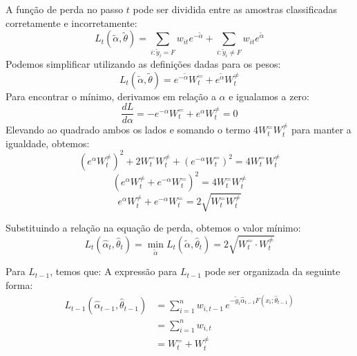 A função de perda no passo $t$ pode ser dividida entre as amostras classificadas corretamente e incorretamente:
\begin{equation*}
    L_t(\tilde{\alpha}, \tilde{\theta}) = \sum_{i: \tilde{y}_i = F} w_{it} e^{-\tilde{\alpha}} + \sum_{i: \tilde{y}_i \neq F} w_{it} e^{\tilde{\alpha}}
\end{equation*}
Podemos simplificar utilizando as definições dadas para os pesos:
\begin{equation*}
    L_t(\tilde{\alpha}, \tilde{\theta}) = e^{-\tilde{\alpha}}W_t^{=} + e^{\tilde{\alpha}}W_t^{\neq}
\end{equation*}
Para encontrar o mínimo, derivamos em relação a $\alpha$ e igualamos a zero:
\begin{equation*}
    \frac{dL}{d\alpha} = -e^{-\alpha} W_t^{=} + e^{\alpha} W_t^{\neq} = 0
\end{equation*}
Elevando ao quadrado ambos os lados e somando o termo 4$W_t^{=}W_t^{\neq}$ para manter a igualdade, obtemos:
\begin{equation*}
    (e^{\alpha} W_t^{\neq})^2 + 2W_t^{=}W_t^{\neq} + (e^{-\alpha}W_t^{=})^2 = 4W_t^{=}W_t^{\neq}
\end{equation*}
\begin{equation*}
    (e^{\alpha} W_t^{\neq} + e^{-\alpha} W_t^{=})^2 = 4W_t^{=}W_t^{\neq}
\end{equation*}
\begin{equation*}
    e^{\alpha} W_t^{\neq} + e^{-\alpha} W_t^{=} = 2\sqrt{W_t^{=}W_t^{\neq}}
\end{equation*}

Substituindo a relação na equação de perda, obtemos o valor mínimo:
\begin{equation*}
    L_t(\hat{\alpha}_t, \hat{\theta}_t) = \min_{\tilde{\alpha}} L_t(\tilde{\alpha}, \hat{\theta}_t) = 2\sqrt{W_t^{=} \cdot W_t^{\neq}}
\end{equation*}

Para $L_{t-1}$, temos que:
A expressão para $L_{t-1}$ pode ser organizada da seguinte forma:
\begin{align*}
    L_{t-1}(\hat{\alpha}_{t-1}, \hat{\theta}_{t-1})
     & = \sum_{i=1}^{n} w_{i,t-1} \, e^{-\tilde{y}_i \hat{\alpha}_{t-1} F(x_i; \hat{\theta}_{t-1})} \\
     & = \sum_{i=1}^{n} w_{i,t}                                                                     \\
     & = W_t^{=} + W_t^{\neq}
\end{align*}
